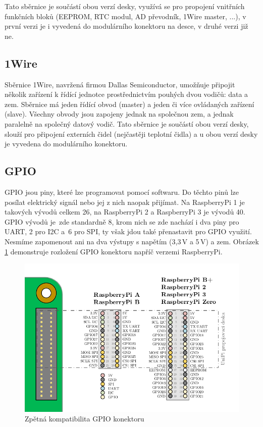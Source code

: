 Tato sběrnice je součástí obou verzí desky, využívá se pro propojení vnitřních funkčních bloků (EEPROM, RTC modul, AD převodník, 1Wire master, ...), v první verzi je i vyvedená do modulárního konektoru na desce, v druhé verzi již ne.

\subsection{1Wire}
Sběrnice 1Wire, navržená firmou Dallas Semiconductor, umožňuje připojit několik zařízení k řídící jednotce prostřednictvím pouhých dvou vodičů: data a zem. Sběrnice má jeden řídící obvod (master) a jeden či více ovládaných zařízení (slave). Všechny obvody jsou zapojeny jednak na společnou zem, a jednak paralelně na společný datový vodič. Tato sběrnice je součástí obou verzí desky, slouží pro připojení externích čidel (nejčastěji teplotní čidla) a u obou verzí desky je vyvedena do modulárního konektoru.

\subsection{GPIO}
\label{KapGPIO}
GPIO jsou piny, které lze programovat pomocí softwaru. Do těchto pinů lze posílat elektrický signál nebo jej z nich naopak přijímat. Na RaspberryPi 1 je takových vývodů celkem 26, na RaspberryPi 2 a RaspberryPi 3 je vývodů 40. GPIO vývodů je~zde standardně 8, krom nich se zde nachází i dva piny pro UART, 2 pro I2C a~6 pro SPI, ty však jdou také přenastavit pro GPIO využití. Nesmíme zapomenout ani na dva výstupy s napětím (3,3\,V a 5\,V) a zem.
Obrázek \ref{ObrazekGPIO} demonstruje rozložení GPIO konektoru napříč verzemi RaspberryPi.

\begin{figure}[!ht]
\vspace{-20pt}
  \begin{center}
    \includegraphics[scale=1.0]{obrazky/unipi_gpio}
  \end{center}
	\vspace{-20pt}
  \caption{Zpětná kompatibilita GPIO konektoru}
	\label{ObrazekGPIO}
	\vspace{-10pt}
\end{figure}

